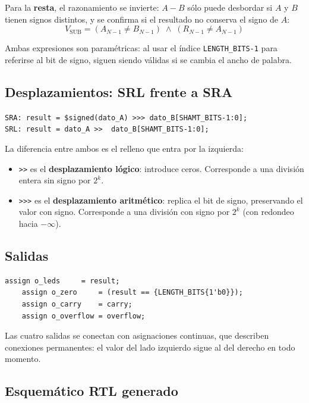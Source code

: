 \documentclass[12pt,a4paper]{article}
\begin{document}
Para la \textbf{resta}, el razonamiento se invierte: $A-B$ sólo puede desbordar si $A$ y
$B$ tienen signos distintos, y se confirma si el resultado no conserva el signo de $A$:
$$V_{\text{SUB}} = (A_{N-1} \neq B_{N-1}) \;\wedge\; (R_{N-1} \neq A_{N-1})$$

Ambas expresiones son paramétricas: al usar el índice \texttt{LENGTH\_BITS-1} para
referirse al bit de signo, siguen siendo válidas si se cambia el ancho de palabra.

\subsection{Desplazamientos: SRL frente a SRA}

\begin{center}
\texttt{SRA:  result = \$signed(dato\_A) >>> dato\_B[SHAMT\_BITS-1:0];}\\
\texttt{SRL:  result = dato\_A          >>\ \ dato\_B[SHAMT\_BITS-1:0];}
\end{center}

La diferencia entre ambos es el relleno que entra por la izquierda:

\begin{itemize}[leftmargin=1.4em]
  \item \texttt{>>} es el \textbf{desplazamiento lógico}: introduce ceros. Corresponde a
        una división entera sin signo por $2^k$.
  \item \texttt{>>>} es el \textbf{desplazamiento aritmético}: replica el bit de signo,
        preservando el valor con signo. Corresponde a una división con signo por $2^k$
        (con redondeo hacia $-\infty$).
\end{itemize}

\subsection{Salidas}

\begin{lstlisting}[caption={Asignaciones continuas de salida.},label={lst:out}]
    assign o_leds     = result;
    assign o_zero     = (result == {LENGTH_BITS{1'b0}});
    assign o_carry    = carry;
    assign o_overflow = overflow;
\end{lstlisting}

Las cuatro salidas se conectan con asignaciones continuas, que describen conexiones
permanentes: el valor del lado izquierdo sigue al del derecho en todo momento.

\subsection{Esquemático RTL generado}
\end{document}

